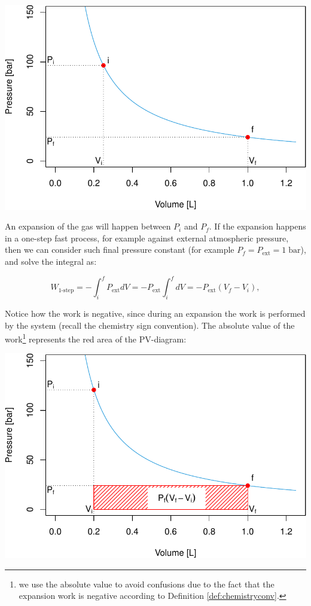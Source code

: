 \documentclass[
  9pt,
]{extbook}
\theoremstyle{definition}
\theoremstyle{definition}
\theoremstyle{definition}
\theoremstyle{remark}
\begin{document}
\begin{center}\includegraphics[width=0.7\linewidth]{pchem1_files/figure-latex/unnamed-chunk-2-1} \end{center}

An expansion of the gas will happen between \(P_i\) and \(P_f\). If the expansion happens in a one-step fast process, for example against external atmospheric pressure, then we can consider such final pressure constant (for example \(P_f=P_{\text{ext}} =1\;\mathrm{bar}\)), and solve the integral as:

\begin{equation}
  W_{\text{1-step}} = - \int_{i}^{f} P_{\text{ext}}dV = -P_{\text{ext}} \int_{i}^{f} dV = -P_{\text{ext}} (V_f-V_i),
  \label{eq:Wint3}
\end{equation}

Notice how the work is negative, since during an expansion the work is performed by the system (recall the chemistry sign convention). The absolute value of the work\footnote{we use the absolute value to avoid confusions due to the fact that the expansion work is negative according to Definition \ref{def:chemistryconv}.} represents the red area of the PV-diagram:

\begin{center}\includegraphics[width=0.7\linewidth]{pchem1_files/figure-latex/unnamed-chunk-3-1} \end{center}
\end{document}
